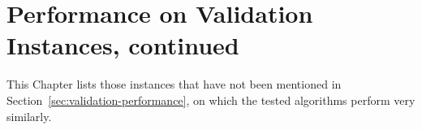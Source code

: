 \documentclass[thesis.tex]{subfiles}
\newcommand{\CurrentInstance}{}
\newcommand{\CurrentInstanceFileEscaped}{}
\newcommand{\CurrentInstanceTexEscaped}{}
\begin{document}

\chapter{Performance on Validation Instances, continued}
%
   \label{appendix:boring-validation-instances}
%

This Chapter lists those instances that have not been mentioned in Section~\vref{sec:validation-performance}, on which the tested algorithms perform very similarly.

   \renewcommand{\CurrentInstance}{\Instance{barley}}
   \renewcommand{\CurrentInstanceFileEscaped}{barley}
   \renewcommand{\CurrentInstanceTexEscaped}{barley}

%
   \renewcommand{\CurrentInstance}{\Instance{pathfinder}}
   \renewcommand{\CurrentInstanceFileEscaped}{pathfinder}
   \renewcommand{\CurrentInstanceTexEscaped}{pathfinder}


   \renewcommand{\CurrentInstance}{\Instance{oesoca+}}
   \renewcommand{\CurrentInstanceFileEscaped}{oesoca+}
   \renewcommand{\CurrentInstanceTexEscaped}{oesoca+}


   \renewcommand{\CurrentInstance}{\Instance{pigs}}
   \renewcommand{\CurrentInstanceFileEscaped}{pigs}
   \renewcommand{\CurrentInstanceTexEscaped}{pigs}


\end{document}
